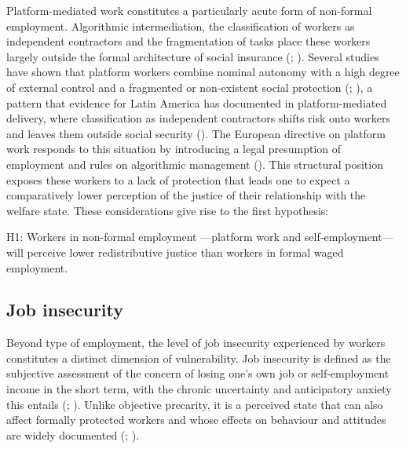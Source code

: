 \documentclass[
  12pt,
]{article}
\begin{document}
Platform-mediated work constitutes a particularly acute form of
non-formal employment. Algorithmic intermediation, the classification of
workers as independent contractors and the fragmentation of tasks place
these workers largely outside the formal architecture of social
insurance (;
). Several studies have
shown that platform workers combine nominal autonomy with a high degree
of external control and a fragmented or non-existent social protection
(;
), a pattern that evidence for
Latin America has documented in platform-mediated delivery, where
classification as independent contractors shifts risk onto workers and
leaves them outside social security
(). The European directive on platform work responds to this
situation by introducing a legal presumption of employment and rules on
algorithmic management
(). This structural
position exposes these workers to a lack of protection that leads one to
expect a comparatively lower perception of the justice of their
relationship with the welfare state. These considerations give rise to
the first hypothesis:

\begin{tcolorbox}[enhanced jigsaw, arc=.35mm, bottomrule=.15mm, breakable, colback=white, colframe=quarto-callout-color-frame, left=2mm, leftrule=.75mm, opacityback=0, rightrule=.15mm, toprule=.15mm]

H1: Workers in non-formal employment ---platform work and
self-employment--- will perceive lower redistributive justice than
workers in formal waged employment.

\end{tcolorbox}

\subsection{Job insecurity}\label{job-insecurity}

Beyond type of employment, the level of job insecurity experienced by
workers constitutes a distinct dimension of vulnerability. Job
insecurity is defined as the subjective assessment of the concern of
losing one's own job or self-employment income in the short term, with
the chronic uncertainty and anticipatory anxiety this entails
(;
). Unlike objective
precarity, it is a perceived state that can also affect formally
protected workers and whose effects on behaviour and attitudes are
widely documented (; ).
\end{document}

